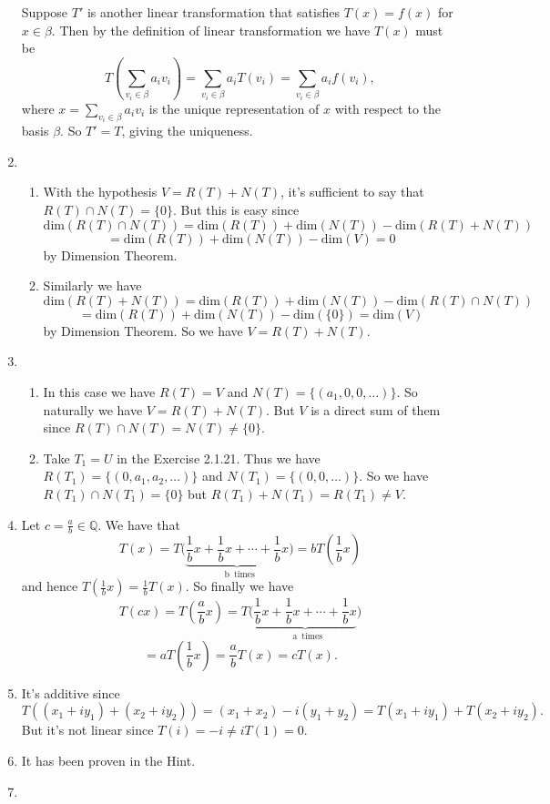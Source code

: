 \begin{enumerate}
Suppose $T'$ is another linear transformation that satisfies $T(x)=f(x)$ for $x\in\beta$.  Then by the definition of linear transformation we have $T(x)$ must be 
\[T(\sum_{v_i\in\beta}{a_iv_i})=\sum_{v_i\in\beta}{a_iT(v_i)}=\sum_{v_i\in\beta}{a_if(v_i)},\]
where $x=\sum_{v_i\in\beta}{a_iv_i}$ is the unique representation of $x$ with respect to the basis $\beta$. So $T'=T$, giving the uniqueness.
\item \begin{enumerate}
\item With the hypothesis $V=R(T)+N(T)$, it's sufficient to say that $R(T)\cap N(T)=\{0\} $. But this is easy since 
\[\mathrm{dim}(R(T)\cap N(T))=\mathrm{dim}(R(T))+\mathrm{dim}(N(T))-\mathrm{dim}(R(T)+N(T))\]
\[=\mathrm{dim}(R(T))+\mathrm{dim}(N(T))-\mathrm{dim}(V)=0\]
by Dimension Theorem.
\item Similarly we have 
\[\mathrm{dim}(R(T)+N(T))=\mathrm{dim}(R(T))+\mathrm{dim}(N(T))-\mathrm{dim}(R(T)\cap N(T))\]
\[=\mathrm{dim}(R(T))+\mathrm{dim}(N(T))-\mathrm{dim}(\{0\})=\mathrm{dim}(V)\]
by Dimension Theorem. So we have $V=R(T)+N(T)$.
\end{enumerate}
\item \begin{enumerate}
\item In this case we have $R(T)=V$ and $N(T)=\{(a_1,0,0,\ldots )\}$. So naturally we have $V=R(T)+N(T)$. But $V$ is a direct sum of them since $R(T)\cap N(T)=N(T)\neq \{0\}$.
\item Take $T_1=U$ in the Exercise 2.1.21. Thus we have $R(T_1)=\{(0,a_1,a_2,\ldots )\}$ and $N(T_1)=\{(0,0,\ldots )\}$. So we have $R(T_1)\cap N(T_1)=\{0\}$ but $R(T_1)+N(T_1)=R(T_1)\neq V$.
\end{enumerate}
\item Let $c=\frac{a}{b} \in \mathbb{Q}$. We have that 
\[T(x)=T(\underset{\mathrm{b\enspace times}}{\underbrace{\frac{1}{b}x+\frac{1}{b}x+\cdots +\frac{1}{b}x})}=bT(\frac{1}{b}x)\]
and hence $T(\frac{1}{b}x)=\frac{1}{b}T(x)$. So finally we have 
\[T(cx)=T(\frac{a}{b}x)=T(\underset{\mathrm{a\enspace times}}{\underbrace{\frac{1}{b}x+\frac{1}{b}x+\cdots +\frac{1}{b}x})}\]
\[=aT(\frac{1}{b}x)=\frac{a}{b}T(x)=cT(x).\]
\item It's additive since 
\[T((x_1+iy_1)+(x_2+iy_2))=(x_1+x_2)-i(y_1+y_2)=T(x_1+iy_1)+T(x_2+iy_2).\]
But it's not linear since $T(i)=-i\neq iT(1)=0$.
\item It has been proven in the Hint.
\item \begin{enumerate}

\end{enumerate}
\end{enumerate}
